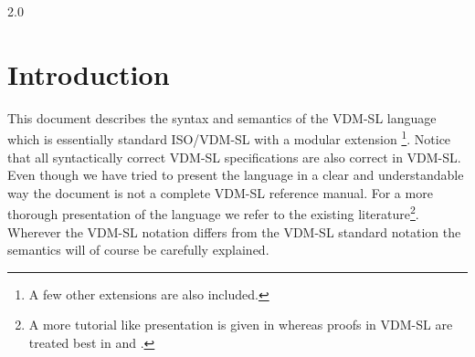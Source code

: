 \documentclass[\pformat,12pt]{article}
\begin{document}

        {2.0}


\newcommand{\Lit}[1]{`{\tt #1}\Quote}
\newcommand{\Rule}[2]{
  \begin{quote}\begin{tabbing}
    #1\index{#1}\ \ \= = \ \ \= #2  ; %
    
  \end{tabbing}\end{quote}
  }
\newcommand{\SeqPt}[1]{\{\ #1\ \}}
\newcommand{\lfeed}{\\ \> \>}
\newcommand{\dsepl}{\ $|$\ }
\newcommand{\dsep}{\\ \> $|$ \>}
\newcommand{\Lop}[1]{`{\sf #1}\Quote}
\newcommand{\blankline}{\vspace{\baselineskip}}
\newcommand{\Brack}[1]{(\ #1\ )}
\newcommand{\nmk}{\footnotemark}
\newcommand{\ntext}[1]{\footnotetext{{\bf Note: } #1}}
\newlength{\kwlen}
\newcommand{\Keyw}[1]{\settowidth{\kwlen}{\tt #1}\makebox[\kwlen][l]{\sf
    #1}}
\newcommand{\keyw}[1]{{\sf #1}}
\newcommand{\id}[1]{{\tt #1}}
\newcommand{\metaiv}[1]{\begin{alltt}\end{alltt}}

\newcommand{\OptPt}[1]{[\ #1\ ]}
\newcommand{\MAP}[2]{\kw{map }#1\kw{ to }#2}
\newcommand{\INMAP}[2]{\kw{inmap }#1\kw{ to }#2}
\newcommand{\SEQ}[1]{\kw{seq of }#1}
\newcommand{\NSEQ}[1]{\kw{seq1 of }#1}
\newcommand{\SET}[1]{\kw{set of }#1}
\newcommand{\PROD}[2]{#1 * #2}
\newcommand{\TO}[2]{$#1 \To #2$}
\newcommand{\FUN}[2]{#1 \To #2}
\newcommand{\PUBLIC}{\ifthenelse{\boolean{VDMpp}}{public\mbox{}}{\mbox{}}}
\newcommand{\PRIVATE}{\ifthenelse{\boolean{VDMpp}}{private}{\mbox{}}}
\newcommand{\PROTECTED}{\ifthenelse{\boolean{VDMpp}}{protected}{\mbox{}}}




\section{Introduction}


This document describes the syntax and semantics of the  VDM-SL
language which is essentially standard ISO/VDM-SL \cite{ISOVDM96}
with a modular extension
\footnote{A few other extensions are also included.}.
Notice that all syntactically correct VDM-SL specifications are also correct in
 VDM-SL. 
Even though we have tried to present the language in a
clear and understandable way the document is not a complete VDM-SL
reference manual. 
For a more thorough presentation of the language we refer to the
existing literature\footnote{A more tutorial like
presentation is given in \cite{Fitzgerald&98} whereas proofs in VDM-SL
are treated best in \cite{Jones90a} and \cite{Bicarregui&94}.}.
Wherever the  VDM-SL notation differs from
the VDM-SL standard notation the semantics will of course be carefully
explained.
\end{document}
